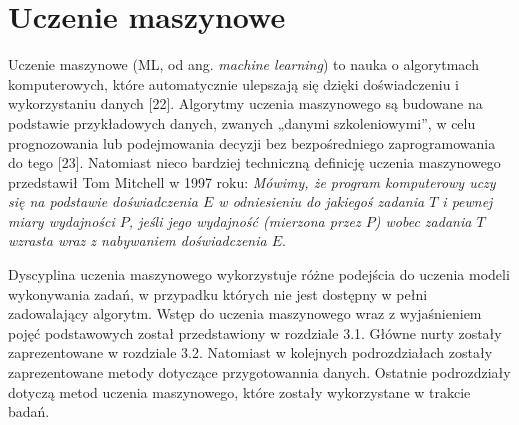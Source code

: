 %		
%
%
%
%

\chapter{Uczenie maszynowe}
\label{cha:cha3}

Uczenie maszynowe (ML, od ang. \textit{machine learning}) to nauka o algorytmach komputerowych, które automatycznie ulepszają się dzięki doświadczeniu i wykorzystaniu danych [22]. Algorytmy uczenia maszynowego są budowane na podstawie przykładowych danych, zwanych „danymi szkoleniowymi”, w celu prognozowania lub podejmowania decyzji bez bezpośredniego zaprogramowania do tego [23]. Natomiast nieco bardziej techniczną definicję uczenia maszynowego przedstawił Tom Mitchell w 1997 roku: \textit{Mówimy, że program komputerowy uczy się na podstawie doświadczenia $E$ w odniesieniu do jakiegoś zadania $T$ i pewnej miary wydajności $P$, jeśli jego wydajność (mierzona przez $P$) wobec zadania $T$ wzrasta wraz z nabywaniem doświadczenia $E$}.

Dyscyplina uczenia maszynowego wykorzystuje różne podejścia do uczenia modeli wykonywania zadań, w przypadku których nie jest dostępny w pełni zadowalający algorytm. Wstęp do uczenia maszynowego wraz z wyjaśnieniem pojęć podstawowych został przedstawiony w rozdziale 3.1. Główne nurty zostały zaprezentowane w rozdziale 3.2. Natomiast w kolejnych podrozdziałach zostały zaprezentowane metody dotyczące przygotowannia danych. Ostatnie podrozdziały dotyczą metod  uczenia maszynowego, które zostały wykorzystane w trakcie badań.

